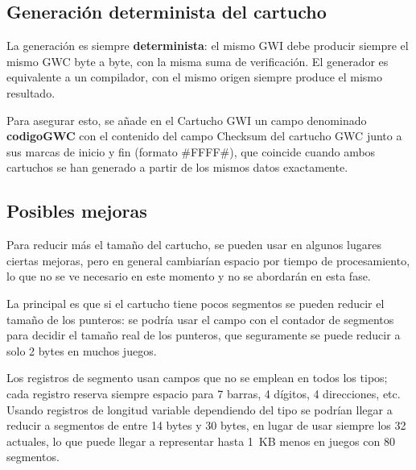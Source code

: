 \subsection{Generación determinista del cartucho}
\label{sec:F5I2Def}

La generación es siempre \textbf{determinista}: el mismo GWI debe
producir siempre el mismo GWC byte a byte, con la misma suma de
verificación. El generador es equivalente a un compilador, con
el mismo origen siempre produce el mismo resultado.

Para asegurar esto, se añade en el Cartucho GWI un campo denominado \textbf{codigoGWC} con el contenido del campo Checksum del cartucho GWC junto a sus marcas de inicio y fin (formato \#FFFF\#), que coincide cuando ambos cartuchos se han generado a partir de los mismos datos exactamente.

\subsection{Posibles mejoras}
\label{sec:F5I2Mejoras}

Para reducir más el tamaño del cartucho, se pueden usar en algunos lugares ciertas mejoras, pero en general cambiarían espacio por tiempo de procesamiento, lo que no se ve necesario en este momento y no se abordarán en esta fase.

La principal es que si el cartucho tiene pocos segmentos se pueden reducir el tamaño de los punteros: se podría usar el campo con el contador de segmentos para decidir el tamaño real de los punteros, que seguramente se puede reducir a solo 2 bytes en muchos juegos.

Los registros de segmento usan campos que no se emplean en todos los tipos; cada registro reserva siempre espacio para 7 barras, 4 dígitos, 4 direcciones, etc. Usando registros de longitud variable dependiendo del tipo se podrían llegar a reducir a segmentos de entre 14 bytes y 30 bytes, en lugar de usar siempre los 32 actuales, lo que puede llegar a representar hasta 1~KB menos en juegos con 80 segmentos.

